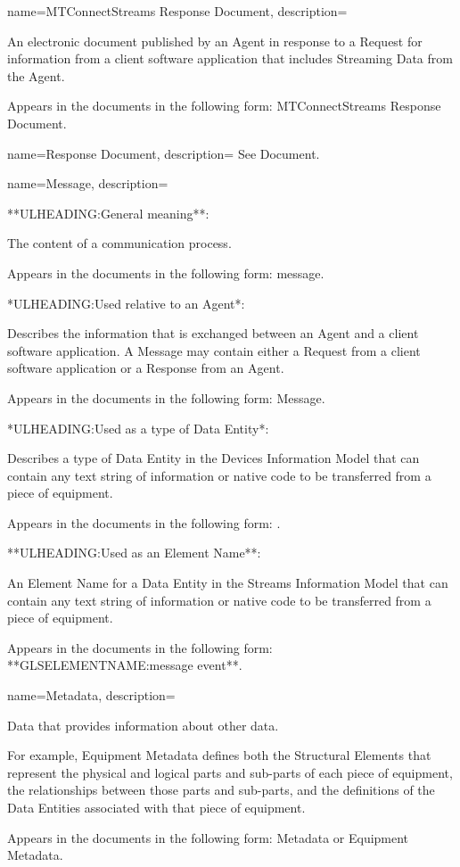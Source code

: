 {
    name={MTConnectStreams Response Document},
	description={
	An electronic document published by an \gls{Agent} in response to a \gls{Request} for information from a client software application that includes \gls{Streaming Data} from the \gls{Agent}.

	Appears in the documents in the following form: \gls{MTConnectStreams Response Document}.
}
}

{
    name={Response Document},
	description={
	See \gls{Document}.
}
}

{
    name={Message},
	description={
	**ULHEADING:General meaning**:

	The content of a communication process.

	Appears in the documents in the following form: message.

	*ULHEADING:Used relative to an \gls{Agent}*:

	Describes the information that is exchanged between an \gls{Agent} and a client software application.  A \gls{Message} may contain either a \gls{Request} from a client software application or a \gls{Response} from an \gls{Agent}.

	Appears in the documents in the following form: \gls{Message}.

	*ULHEADING:Used as a type of \gls{Data Entity}*:

	Describes a type of \gls{Data Entity} in the \gls{Devices Information Model} that can contain any text string of information or native code to be transferred from a piece of equipment.

	Appears in the documents in the following form: .

	**ULHEADING:Used as an Element Name**:

	An \gls{Element Name} for a \gls{Data Entity} in the \gls{Streams Information Model} that can contain any text string of information or native code to be transferred from a piece of equipment.

	Appears in the documents in the following form:  **GLSELEMENTNAME:message event**.
}
}

{
    name={Metadata},
	description={
	Data that provides information about other data.

	For example, \gls{Equipment Metadata} defines both the \gls{Structural Elements} that represent the physical and logical parts and sub-parts of each piece of equipment, the relationships between those parts and sub-parts, and the definitions of the \gls{Data Entities} associated with that piece of equipment.

	Appears in the documents in the following form: \gls{Metadata} or \gls{Equipment Metadata}.
}
}

